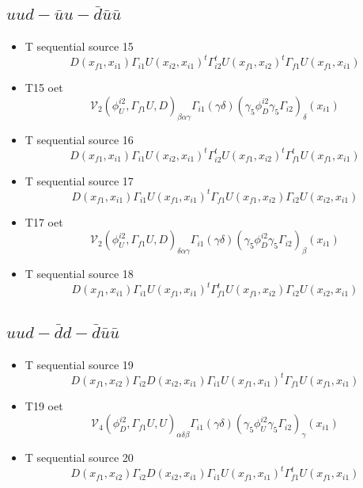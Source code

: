 \documentclass{article}[12pt]
\begin{document}
\subsection{$uud-\bar{u}u-\bar{d}\bar{u}\bar{u}$}
\begin{itemize}
\item  T sequential source 15
$$
D(x_{f1},x_{i1})\Gamma_{i1}U(x_{i2},x_{i1})^t\Gamma_{i2}^tU(x_{f1},x_{i2})^t\Gamma_{f1}U(x_{f1},x_{i1})
$$
\item T15 oet
$$
{\mathcal V}_2\left(\phi_U^{i2},\Gamma_{f1}U,D\right)_{\beta\alpha\gamma}
\Gamma_{i1}(\gamma\delta)(\gamma_5\phi_D^{i2}\gamma_5\Gamma_{i2})_\delta(x_{i1})
$$
\item  T sequential source 16
$$
D(x_{f1},x_{i1})\Gamma_{i1}U(x_{i2},x_{i1})^t\Gamma_{i2}^tU(x_{f1},x_{i2})^t\Gamma_{f1}^tU(x_{f1},x_{i1})
$$
\item  T sequential source 17
$$
D(x_{f1},x_{i1})\Gamma_{i1}U(x_{f1},x_{i1})^t\Gamma_{f1}U(x_{f1},x_{i2})\Gamma_{i2}U(x_{i2},x_{i1})
$$
\item T17 oet
$$
{\mathcal V}_2\left(\phi_U^{i2},\Gamma_{f1}U,D\right)_{\delta\alpha\gamma}
\Gamma_{i1}(\gamma\delta)(\gamma_5\phi_D^{i2}\gamma_5\Gamma_{i2})_\beta(x_{i1})
$$

\item  T sequential source 18
$$
D(x_{f1},x_{i1})\Gamma_{i1}U(x_{f1},x_{i1})^t\Gamma_{f1}^tU(x_{f1},x_{i2})\Gamma_{i2}U(x_{i2},x_{i1})
$$
\end{itemize}
\subsection{$uud-\bar{d}d-\bar{d}\bar{u}\bar{u}$}
\begin{itemize}
\item  T sequential source 19
$$
D(x_{f1},x_{i2})\Gamma_{i2}D(x_{i2},x_{i1})\Gamma_{i1}U(x_{f1},x_{i1})^t\Gamma_{f1}U(x_{f1},x_{i1})
$$
\item T19 oet
$$
{\mathcal V}_4\left(\phi_D^{i2},\Gamma_{f1}U,U\right)_{\alpha\delta\beta}
\Gamma_{i1}(\gamma\delta)(\gamma_5\phi_U^{i2}\gamma_5\Gamma_{i2})_\gamma(x_{i1})
$$
\item  T sequential source 20
$$
D(x_{f1},x_{i2})\Gamma_{i2}D(x_{i2},x_{i1})\Gamma_{i1}U(x_{f1},x_{i1})^t\Gamma_{f1}^tU(x_{f1},x_{i1})
$$
\end{itemize}
\end{document}
